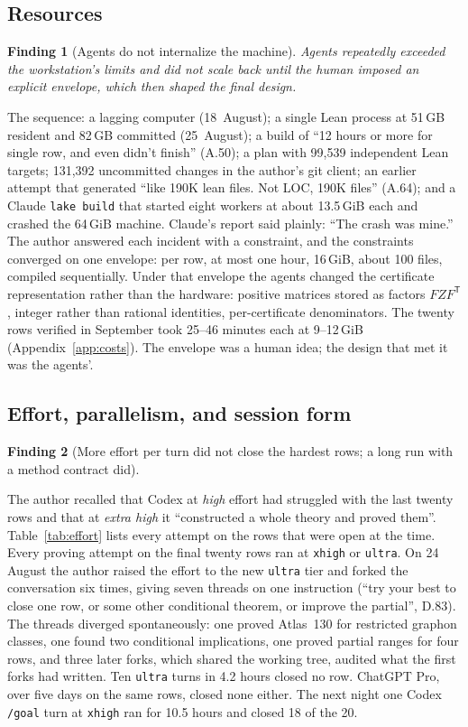 \documentclass[11pt,a4paper]{article}
\newtheorem{finding}{Finding}
\newcommand{\ttt}[1]{\texttt{#1}}
\begin{document}
\subsection{Resources}

\begin{finding}[Agents do not internalize the machine]\label{f:resources}
Agents repeatedly exceeded the workstation's limits and did not scale back until the human imposed an
explicit envelope, which then shaped the final design.
\end{finding}
The sequence: a lagging computer (18~August); a single Lean process at 51\,GB resident and 82\,GB committed
(25~August); a build of ``12 hours or more for single row, and even didn't finish'' (A.50); a plan with 99,539
independent Lean targets; 131,392 uncommitted changes in the author's git client; an earlier attempt that
generated ``like 190K lean files. Not LOC, 190K files'' (A.64); and a Claude \ttt{lake build} that started eight
workers at about 13.5\,GiB each and crashed the 64\,GiB machine. Claude's report said plainly: ``The crash was
mine.'' The author answered each incident with a constraint, and the constraints converged on one envelope: per
row, at most one hour, 16\,GiB, about 100 files, compiled sequentially. Under that envelope the agents changed
the certificate representation rather than the hardware: positive matrices stored as factors $FZF^{\mathsf
T}$, integer rather than rational identities, per-certificate denominators. The twenty rows verified in
September took 25--46 minutes each at 9--12\,GiB (Appendix~\ref{app:costs}). The envelope was a human idea; the
design that met it was the agents'.

\subsection{Effort, parallelism, and session form}

\begin{finding}[More effort per turn did not close the hardest rows; a long run with a method contract did]
\label{f:effort}
\end{finding}
The author recalled that Codex at \emph{high} effort had struggled with the last twenty rows and that at
\emph{extra high} it ``constructed a whole theory and proved them''. Table~\ref{tab:effort} lists every attempt
on the rows that were open at the time. Every proving attempt on the final twenty rows ran at \ttt{xhigh} or
\ttt{ultra}. On 24 August the author raised the effort to the new \ttt{ultra} tier and forked the
conversation six times, giving seven threads on one instruction (``try your best to close one row, or some
other conditional theorem, or improve the partial'', D.83). The threads diverged spontaneously: one proved
Atlas~130 for restricted graphon classes, one found two conditional implications, one proved partial ranges for
four rows, and three later forks, which shared the working tree, audited what the first forks had written.
Ten \ttt{ultra} turns in 4.2 hours closed no row. ChatGPT Pro, over five days on the same rows, closed none
either. The next night one Codex \ttt{/goal} turn at \ttt{xhigh} ran for 10.5 hours and closed 18 of the 20.
\end{document}
